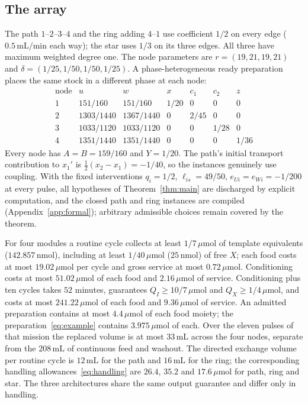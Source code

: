 \documentclass[11pt,a4paper]{article}
\theoremstyle{plain}
\theoremstyle{definition}
\theoremstyle{remark}
\newcommand{\Iv}{I}
\newcommand{\umol}{\,\mu\mathrm{mol}}
\newcommand{\nmol}{\,\mathrm{nmol}}
\begin{document}
\subsection{The array}
The path $1$--$2$--$3$--$4$ and the ring adding $4$--$1$ use coefficient $1/2$ on every edge ($0.5\,\mathrm{mL/min}$ each way); the star uses $1/3$ on its three edges. All three have maximum weighted degree one. The node parameters are $r=(19,21,19,21)$ and $\delta=(1/25,1/50,1/50,1/25)$. A phase-heterogeneous ready preparation places the same stock in a different phase at each node:
\begin{equation}\label{eq:example}
\begin{array}{c|rrrrrr}
\text{node}&u&w&x&c_1&c_2&z\\\hline
1&151/160&151/160&1/20&0&0&0\\
2&1303/1440&1367/1440&0&2/45&0&0\\
3&1033/1120&1033/1120&0&0&1/28&0\\
4&1351/1440&1351/1440&0&0&0&1/36
\end{array}
\end{equation}
Every node has $A=B=159/160$ and $Y=1/20$. The path's initial transport contribution to $x_1'$ is $\frac12(x_2-x_1)=-1/40$, so the instances genuinely use coupling. With the fixed interventions $q_i=1/2$, $\ell_{is}=49/50$, $e_{Ui}=e_{Wi}=-1/200$ at every pulse, all hypotheses of Theorem~\ref{thm:main} are discharged by explicit computation, and the closed path and ring instances are compiled (Appendix~\ref{app:formal}); arbitrary admissible choices remain covered by the theorem.

For four modules a routine cycle collects at least $1/7\umol$ of template equivalents ($142.857\nmol$), including at least $1/40\umol$ ($25\nmol$) of free $X$; each food costs at most $19.02\umol$ per cycle and gross service at most $0.72\umol$. Conditioning costs at most $51.02\umol$ of each food and $2.16\umol$ of service. Conditioning plus ten cycles takes $52$ minutes, guarantees $Q_\Iv\ge10/7\umol$ and $Q_X\ge1/4\umol$, and costs at most $241.22\umol$ of each food and $9.36\umol$ of service. An admitted preparation contains at most $4.4\umol$ of each food moiety; the preparation~\eqref{eq:example} contains $3.975\umol$ of each. Over the eleven pulses of that mission the replaced volume is at most $33\,\mathrm{mL}$ across the four nodes, separate from the $208\,\mathrm{mL}$ of continuous feed and washout. The directed exchange volume per routine cycle is $12\,\mathrm{mL}$ for the path and $16\,\mathrm{mL}$ for the ring; the corresponding handling allowances~\eqref{eq:handling} are $26.4$, $35.2$ and $17.6\umol$ for path, ring and star. The three architectures share the same output guarantee and differ only in handling.
\end{document}
